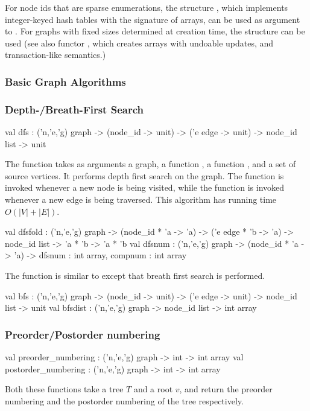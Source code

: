 For node ids that are sparse enumerations, the structure , 
which implements integer-keyed hash tables
with the signature of arrays, can be used
as argument to .  
For graphs with fixed sizes determined at creation time,
the structure  can be used (see also 
functor ,
which creates arrays with undoable updates, and transaction-like semantics.)

\subsubsection{Basic Graph Algorithms}

\subsubsection{Depth-/Breath-First Search}

\begin{SML}
   val dfs : ('n,'e,'g) graph  ->
             (node_id -> unit) ->
             ('e edge -> unit) ->
             node_id list -> unit
\end{SML}
   The function  takes as arguments a graph,
a function , a function 
, and a
set of source vertices.  It performs depth first search on the
graph.  The function  is invoked 
whenever a new node is being visited, while the function 
is invoked whenever a new edge is being traversed.
This algorithm has running time $O(|V|+|E|)$.

\begin{SML}
   val dfsfold : ('n,'e,'g) graph  ->
                 (node_id * 'a -> 'a) ->
                 ('e edge * 'b -> 'a) ->
                 node_id list -> 'a * 'b -> 'a * 'b
   val dfsnum :  ('n,'e,'g) graph  ->
                 (node_id * 'a -> 'a) ->
                 { dfsnum : int array, compnum : int array }
\end{SML}

   The function  is similar to 
except that breath first search is performed.
\begin{SML} 
   val bfs : ('n,'e,'g) graph  ->
             (node_id -> unit) ->
             ('e edge -> unit) ->
             node_id list -> unit
   val bfsdist : ('n,'e,'g) graph -> node_id list -> int array
\end{SML} 

\subsubsection{Preorder/Postorder numbering}
\begin{SML}
   val preorder_numbering  : ('n,'e,'g) graph -> int -> int array
   val postorder_numbering : ('n,'e,'g) graph -> int -> int array
\end{SML}  
   Both these functions take a tree $T$ and a root $v$, and return
the preorder numbering and the postorder numbering of the tree respectively. 

